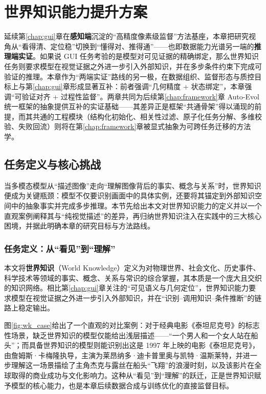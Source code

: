 \chapter{世界知识能力提升方案}
\label{chap:world_knowledge}

延续第\ref{chap:gui}章在\textbf{感知端}沉淀的“高精度像素级监督”方法基座，本章把研究视角从“看得清、定位稳”切换到“懂得对、推得通”——也即数据能力光谱另一端的\textbf{推理端实证}。如果说 GUI 任务考验的是模型对可见证据的精确绑定，那么世界知识任务则要求模型在视觉证据之外进一步引入外部知识，并在多步条件约束下完成可验证的推理。本章作为“两端实证”路线的另一极，在数据组织、监督形态与质控目标上与第\ref{chap:gui}章形成显著互补：前者强调“几何精度 + 状态绑定”，本章强调“可验证对齐 + 过程性监督”。两章共同为后续第\ref{chap:framework}章 Auto-Evol 统一框架的抽象提供互补的实证基础——其差异正是框架“共通骨架”得以涌现的前提，而其共通的工程模块（结构化初始化、相关性过滤、原子化任务分解、多维校验、失败回流）则将在第\ref{chap:framework}章被显式抽象为可跨任务迁移的方法学。

\section{任务定义与核心挑战}
当多模态模型从“描述图像”走向“理解图像背后的事实、概念与关系”时，世界知识便成为关键瓶颈：模型不仅要识别画面中的具体实例，还要将其锚定到外部知识空间中的抽象事实并完成多步推理。本节先给出本文对世界知识能力的定义并以一个直观案例阐释其与“纯视觉描述”的差异，再归纳世界知识注入在实践中的三大核心困境，并据此明确本章的研究目标与方法路线。

\subsection{任务定义：从“看见”到“理解”}
本文将\textbf{世界知识}（World Knowledge）定义为对物理世界、社会文化、历史事件、科学技术等领域的事实、概念、关系与常识的综合掌握，其本质是一个庞大且交织的知识网络。相比第\ref{chap:gui}章关注的“可见语义与几何定位”，世界知识能力要求模型在视觉证据之外进一步引入外部知识，并在“识别--调用知识--条件推断”的链路上稳定输出。

图\ref{fig:wk_case}给出了一个直观的对比案例：对于经典电影《泰坦尼克号》的标志性场景，缺乏世界知识的模型仅能给出浅层描述——“一个男人和一个女人站在船头”；而具备世界知识的模型则能识别出这是 1997 年上映的电影《泰坦尼克号》，由詹姆斯·卡梅隆执导，主演为莱昂纳多·迪卡普里奥与凯特·温斯莱特，并进一步理解这一场景描绘了主角杰克与露丝在船头“飞翔”的浪漫时刻，以及该影片在全球取得的商业成功与文化影响力。这种从“看见”到“理解”的跃迁，正是世界知识赋予模型的核心能力，也是本章后续数据合成与训练优化的直接监督目标。

